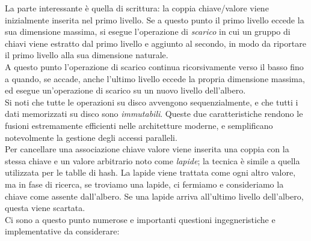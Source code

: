 La parte interessante è quella di scrittura: la coppia chiave/valore viene inizialmente inserita nel primo livello. Se a questo punto il primo livello eccede la sua dimensione massima, si esegue l'operazione di \textit{scarico} in cui un gruppo di chiavi viene estratto dal primo livello e aggiunto al secondo, in modo da riportare il primo livello alla sua dimensione naturale.\\
A questo punto l'operazione di scarico continua ricorsivamente verso il basso fino a quando, se accade, anche l'ultimo livello eccede la propria dimensione massima, ed esegue un'operazione di scarico su un nuovo livello dell'albero.\\
Si noti che tutte le operazioni su disco avvengono sequenzialmente, e che tutti i dati memorizzati su disco sono \textit{immutabili}. Queste due caratteristiche rendono le fusioni estremamente efficienti nelle architetture moderne, e semplificano notevolmente la gestione degli accessi paralleli.\\
Per cancellare una associazione chiave valore viene inserita una coppia con la stessa chiave e un valore arbitrario noto come \textit{lapide}; la tecnica è simile a quella utilizzata per le tablle di hash. La lapide viene trattata come ogni altro valore, ma in fase di ricerca, se troviamo una lapide, ci fermiamo e consideriamo la chiave come assente dall'albero. Se una lapide arriva all'ultimo livello dell'albero, questa viene scartata.\\
Ci sono a questo punto numerose e importanti questioni ingegneristiche e implementative da considerare:

